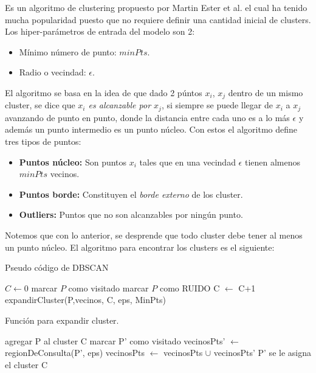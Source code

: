 Es un algoritmo de clustering propuesto por Martin Ester et al. el cual ha tenido mucha popularidad puesto que no requiere definir una cantidad inicial de clusters. Los hiper-parámetros de entrada del modelo son 2:

\begin{itemize}
    \item Mínimo número de punto: $minPts$.
    \item Radio o vecindad: $\epsilon$.
\end{itemize}

El algoritmo se basa en la idea de que dado 2 púntos $x_i$, $x_j$ dentro de un mismo cluster, se dice que \emph{$x_i$ es alcanzable por $x_j$}, si siempre se puede llegar de $x_i$ a $x_j$ avanzando de punto en punto, donde la distancia entre cada uno es a lo más $\epsilon$ y además un punto intermedio es un punto núcleo. Con estos el algoritmo define tres tipos de puntos:

\begin{itemize}
    \item \textbf{Puntos núcleo:} Son puntos $x_i$ tales que en una vecindad $\epsilon$ tienen almenos $minPts$ vecinos.
    \item \textbf{Puntos borde:} Constituyen el \textit{borde externo} de los cluster.
    \item \textbf{Outliers:} Puntos que no son alcanzables por ningún punto.
\end{itemize}

Notemos que con lo anterior, se desprende que todo cluster debe tener al menos un punto núcleo.
El algoritmo para encontrar los clusters es el siguiente:


\begin{algorithm}[H]
  \caption{Pseudo código de DBSCAN
    \label{DBSCAN}}
  \begin{algorithmic}[1]
      \State $C \gets 0$\;
      \State marcar $P$ como visitado
        \State marcar $P$ como RUIDO
        \Else
        \State C $\gets$ C+1
        \State expandirCluster(P,vecinos, C, eps, MinPts)
        \EndIf
      \EndFor
    \EndFunction
  \end{algorithmic}
\end{algorithm}


\begin{algorithm}[H]
  \caption{Función para expandir cluster.
    \label{alg:expandirCluster}}
  \begin{algorithmic}[1]
  \State agregar P al cluster C
         \State marcar P' como visitado\;
         \State vecinosPts' $\gets$ regionDeConsulta(P', eps)\;
            \State vecinosPts $\gets$ vecinosPts $\cup$ vecinosPts'
        \EndIf
    \EndIf
         \State P' se le asigna el cluster C
    \EndIf
    \EndFor
    \EndFunction
  \end{algorithmic}
\end{algorithm}


